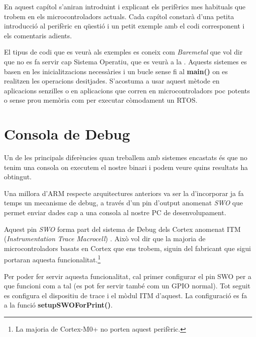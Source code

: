 
En aquest capítol s'aniran introduint i explicant els perifèrics mes habituals que trobem en els microcontroladors actuals. Cada capítol constarà d'una petita introducció al perifèric en qüestió i un petit exemple amb el codi corresponent i els comentaris adients.

\begin{remark}
El tipus de codi que es veurà als exemples es coneix com {\em Baremetal} que vol dir que no es fa servir cap Sistema Operatiu, que es veurà a la . Aquests sistemes es basen en les inicialitzacions necessàries i un bucle sense fi al {\bf main()} on es realitzen les operacions desitjades. S'acostuma a usar aquest mètode en aplicacions senzilles o en aplicacions que corren en microcontroladors poc potents o sense prou memòria com per executar còmodament un \gls{RTOS}.
\end{remark}

\chapter{Consola de Debug}
\label{sub:console}
Un de les principals diferències quan treballem amb sistemes encastats és que no tenim una consola on executem el nostre binari i podem veure quins resultats ha obtingut.

Una millora d'ARM respecte arquitectures anteriors va ser la d'incorporar ja fa temps un mecanisme de debug, a través d'un pin d'output anomenat {\em SWO} que permet enviar dades cap a una consola al nostre PC de desenvolupament.

Aquest pin {\em SWO} forma part del sistema de Debug dels Cortex anomenat ITM ({\em Instrumentation Trace Macrocell}) \cite{ITM}. Això vol dir que la majoria de microcontroladors basats en Cortex que ens trobem, siguin del fabricant que sigui portaran aquesta funcionalitat.\footnote{La majoria de Cortex-M0+ no porten aquest perifèric.}

Per poder fer servir aquesta funcionalitat, cal primer configurar el pin SWO per a que funcioni com a tal (es pot fer servir també com un \gls{GPIO} normal). Tot seguit es configura el dispositiu de trace i el mòdul ITM d'aquest. La configuració es fa a la funció {\bf setupSWOForPrint()}.

